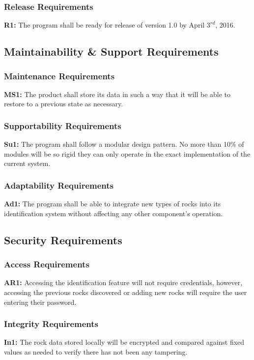 \documentclass[titlepage]{article}
\begin{document}
\subsubsection{Release Requirements}
\textbf{R1:} The program shall be ready for release of version 1.0 by April $3^{rd}$, 2016.

\subsection{Maintainability \& Support Requirements}
\subsubsection{Maintenance Requirements}
\textbf{MS1:} The product shall store its data in such a way that it will be able to restore to a previous state as necessary.
\subsubsection{Supportability Requirements}
\textbf{Su1:} The program shall follow a modular design pattern. No more than 10\% of modules will be so rigid they can only operate in the exact implementation of the current system.
\subsubsection{Adaptability Requirements}
\textbf{Ad1:} The program shall be able to integrate new types of rocks into its identification system without affecting any other component's operation.

\subsection{Security Requirements}
\subsubsection{Access Requirements}
\textbf{AR1:} Accessing the identification feature will not require credentials, however, accessing the previous rocks discovered or adding new rocks will require the user entering their password.
\subsubsection{Integrity Requirements}
\textbf{In1:} The rock data stored locally will be encrypted and compared against fixed values as needed to verify there has not been any tampering.\\
\end{document}
